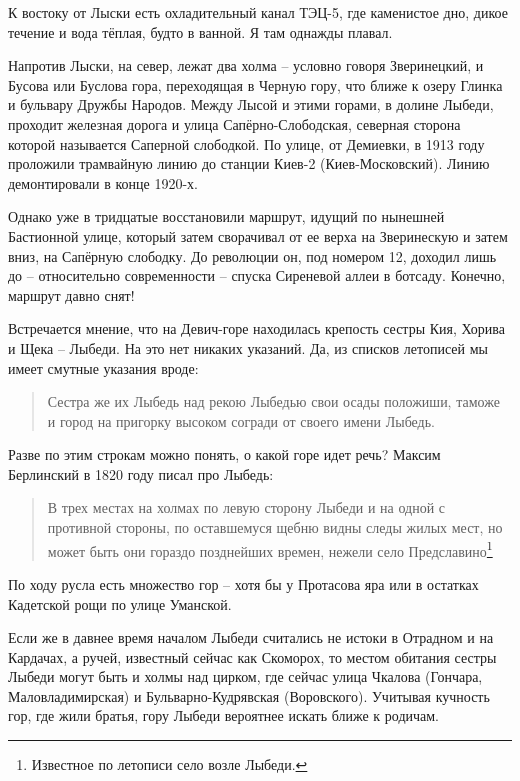 К востоку от Лыски есть охладительный канал ТЭЦ-5, где каменистое дно, дикое течение и вода тёплая, будто в ванной. Я там однажды плавал.

Напротив Лыски, на север, лежат два холма – условно говоря Зверинецкий, и Бусова или Буслова гора, переходящая в Черную гору, что ближе к озеру Глинка и бульвару Дружбы Народов. Между Лысой и этими горами, в долине Лыбеди, проходит железная дорога и улица Сапёрно-Слободская, северная сторона которой называется Саперной слободкой. По улице, от Демиевки, в 1913 году проложили трамвайную линию до станции Киев-2 (Киев-Московский). Линию демонтировали в конце 1920-х.

Однако уже в тридцатые восстановили маршрут, идущий по нынешней Бастионной улице, который затем сворачивал от ее верха на Зверинескую и затем вниз, на Сапёрную слободку. До революции он, под номером 12, доходил лишь до – относительно современности – спуска Сиреневой аллеи в ботсаду. Конечно, маршрут давно снят!

Встречается мнение, что на Девич-горе находилась крепость сестры Кия, Хорива и Щека – Лыбеди. На это нет никаких указаний. Да, из списков летописей мы имеет смутные указания вроде:

\begin{quotation}
Сестра же их Лыбедь над рекою Лыбедью свои осады положиши, таможе и город на пригорку высоком согради от своего имени Лыбедь.\end{quotation}

Разве по этим строкам можно понять, о какой горе идет речь? Максим Берлинский в 1820 году писал про Лыбедь:

\begin{quotation}
В трех местах на холмах по левую сторону Лыбеди и на одной с противной стороны, по оставшемуся щебню видны следы жилых мест, но может быть они гораздо позднейших времен, нежели село Предславино\footnote{Известное по летописи село возле Лыбеди.}
\end{quotation}

По ходу русла есть множество гор – хотя бы у Протасова яра или в остатках Кадетской рощи по улице Уманской.

Если же в давнее время началом Лыбеди считались не истоки в Отрадном и на Кардачах, а ручей, известный сейчас как Скоморох, то местом обитания сестры Лыбеди могут быть и холмы над цирком, где сейчас улица Чкалова (Гончара, Маловладимирская) и Бульварно-Кудрявская (Воровского). Учитывая кучность гор, где жили братья, гору Лыбеди вероятнее искать ближе к родичам.

